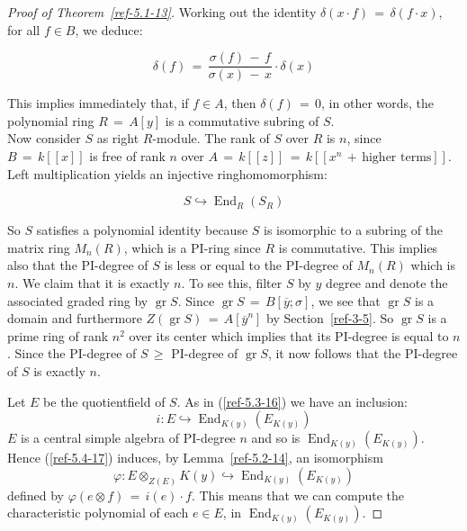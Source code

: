 \documentclass{amsart}
\numberwithin{equation}{section}
\def\gr{\operatorname{gr}}
\def\gr{\operatorname {gr}}
\def\End{\operatorname {End}}
\def\End{\operatorname {End}}
\theoremstyle{definition}
\theoremstyle{remark}
\begin{document}
\begin{proof}[Proof of Theorem~\ref{ref-5.1-13}]
    Working out the identity $\delta(x \cdot f) \,=\, \delta(f \cdot 
    x)$, for all $f \in B$, we deduce:
    
    \begin{equation} \label{ref-5.2-15}
        \delta(f) \,=\, \frac{ \sigma(f) \,-\, f}{\sigma(x) \,-\, x} \cdot 
        \delta(x)
    \end{equation}
    
    This implies immediately that, if $f \in A$, then $\delta(f) \,=\, 
    0$, in other words, the polynomial ring $R \,=\, A[y]$ is a 
    commutative subring of $S$.
    \\ Now consider $S$ as right $R$-module. The rank of $S$ over $R$ 
    is $n$, since $B \,=\, k[[x]]$ is free of rank $n$ over $A \,=\, 
    k[[z]] \,=\, k[[x^{n} \,+\, \mbox{higher terms}]]$.
    \\ Left multiplication yields an injective ringhomomorphism:
    
    \begin{equation} \label{ref-5.3-16}
        S \hookrightarrow \End_{R}(S_{R})
    \end{equation}
    
    So $S$ satisfies a polynomial identity because $S$ is isomorphic 
    to a subring of the matrix ring $M_{n}(R)$, which is a PI-ring 
    since $R$ is commutative. This implies also that the PI-degree 
    of $S$ is less or equal to the PI-degree of $M_{n}(R)$ which is 
    $n$. We claim that it is exactly $n$.
     To see this, filter $S$ by $y$ degree and denote the associated 
    graded ring by $\gr S$.
     Since $\gr S \,=\, B[\overline{y};\sigma]$, we see that 
    $\gr S$ is a domain and furthermore $Z(\gr S) \,=\, 
    A[\overline{y}^{n}]$ by Section~\ref{ref-3-5}. So 
    $\gr S$ is a prime ring of rank $n^{2}$ over its center 
    which implies that its PI-degree is equal to $n$. 
    Since the PI-degree of $S \,\geq$ PI-degree of 
    $\gr S$, it now follows that the PI-degree of $S$ is exactly 
    $n$.
    
     Let $E$ be the quotientfield of $S$. As in (\ref{ref-5.3-16}) we have 
    an inclusion:
        \begin{equation} \label{ref-5.4-17}
        i : E \hookrightarrow \End_{K(y)}(E_{K(y)})
    \end{equation}
        $E$ is a central simple algebra of PI-degree $n$ and so is 
    $\End_{K(y)}(E_{K(y)})$. Hence (\ref{ref-5.4-17}) induces, by 
    Lemma~\ref{ref-5.2-14}, an isomorphism 
        \begin{equation} \label{ref-5.5-18}
        \varphi : E \otimes_{Z(E)} K(y) \hookrightarrow \End_{K(y)}(E_{K(y)})   
    \end{equation}
        defined by $\varphi(e \otimes f) \,=\, i(e) \cdot f$.
         This means that we can compute the characteristic polynomial 
    of each $e \in E$, in $\End_{K(y)}(E_{K(y)})$.
    

\end{proof}
\end{document}
